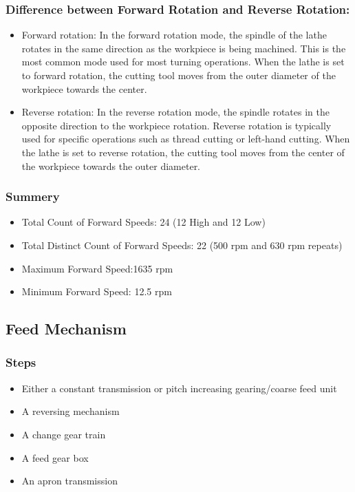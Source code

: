 \documentclass{article}
\begin{document}
\subsubsection*{Difference between Forward Rotation and Reverse Rotation:}
\begin{itemize}
  \item Forward rotation: In the forward rotation mode, the spindle of the lathe rotates in the same direction as the workpiece is being machined. This is the most common mode used for most turning operations. When the lathe is set to forward rotation, the cutting tool moves from the outer diameter of the workpiece towards the center.
  \item Reverse rotation: In the reverse rotation mode, the spindle rotates in the opposite direction to the workpiece rotation. Reverse rotation is typically used for specific operations such as thread cutting or left-hand cutting. When the lathe is set to reverse rotation, the cutting tool moves from the center of the workpiece towards the outer diameter.
\end{itemize}

\subsubsection*{Summery}
\begin{itemize}
  \item Total Count of Forward Speeds: 24 (12 High and 12 Low)
  \item Total Distinct Count of Forward Speeds: 22 (500 rpm and 630 rpm repeats)
  \item Maximum Forward Speed:1635 rpm 
  \item Minimum Forward Speed: 12.5 rpm 
\end{itemize}

\subsection*{Feed Mechanism}
\subsubsection*{Steps}
\begin{itemize}
  \item Either a constant transmission or pitch increasing gearing/coarse feed unit
  \item A reversing mechanism
  \item A change gear train
  \item A feed gear box
  \item An apron transmission
\end{itemize}
\end{document}
